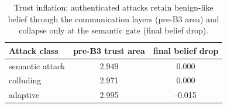 \begin{table}[t]
\centering
\caption{Trust inflation: authenticated attacks retain benign-like belief through the communication layers (pre-B3 area) and collapse only at the semantic gate (final belief drop).}
\label{tab:inflation}
\begin{tabular}{lcc}
\toprule
Attack class & pre-B3 trust area & final belief drop \\
\midrule
semantic attack & 2.949 & 0.000 \\
colluding & 2.971 & 0.000 \\
adaptive & 2.995 & -0.015 \\
\bottomrule
\end{tabular}
\end{table}
